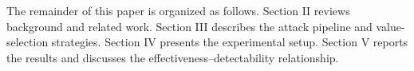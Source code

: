 The remainder of this paper is organized as follows.
Section II reviews background and related work.
Section III describes the attack pipeline and value-selection strategies.
Section IV presents the experimental setup.
Section V reports the results and discusses the effectiveness--detectability relationship.
